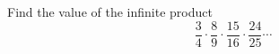 Find the value of the infinite product
\[
\dfrac{3}{4}\cdot\dfrac{8}{9}\cdot\dfrac{15}{16}\cdot\dfrac{24}{25}\cdots
\]
